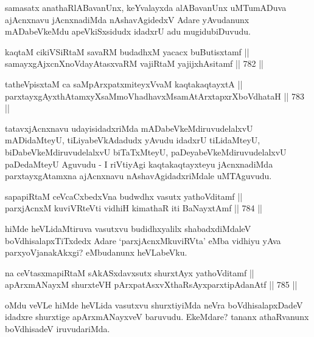 \begin{artha} 
samasatx anathaRlABavanUnx, keYvalayxda alABavanUnx uMTumADuva ajAcnxnavu jAcnxnadiMda nAshavAgidedxV Adare yAvudanunx mADabeVkeMdu apeVkiSxsidudx idadxrU adu mugidubiDuvudu.
\end{artha}


\begin{shl}
kaqtaM cikiVSiRtaM savaRM budadhxM yacacx buButisxtamf || \\
samayxgAjxcnXnoVdayAtasxvaRM vajiRtaM yajijxhAsitamf \hfill || 782 ||  
\end{shl}

\begin{shl}
tatheVpisxtaM ca saMpArxpatxmiteyxVvaM kaqtakaqtayxtA || \\
parxtayxgAyxthAtamxyXsaMmoVhadhavxMsamAtArxtapxrXboVdhataH \hfill || 783 ||  
\end{shl}

\begin{artha} 
tatavxjAcnxnavu udayisidadxriMda mADabeVkeMdiruvudelalxvU mADidaMteyU, tiLiyabeVkAdadudx yAvudu idadxrU tiLidaMteyU, biDabeVkeMdiruvudelalxvU biTaTxMteyU, paDeyabeVkeMdiruvudelalxvU paDedaMteyU Aguvudu - I riVtiyAgi kaqtakaqtayxteyu jAcnxnadiMda parxtayxgAtamxna ajAcnxnavu nAshavAgidadxriMdale uMTAguvudu.
\end{artha}


\begin{shl}
sapapiRtaM ceVcaCxbedxVna budwdhx vasutx yathoVditamf || \\
parxjAcnxM kuviVRteVti vidhiH kimathaR iti BaNayxtAmf \hfill || 784 ||  
\end{shl}

\begin{artha} 
hiMde heVLidaMtiruva vasutxvu budidhxyalilx shabadxdiMdaleV boVdhisalapxTiTxdedx Adare `parxjAcnxMkuviRVta' eMba vidhiyu yAva parxyoVjanakAkxgi? eMbudanunx heVLabeVku.
\end{artha}

\begin{shl}
na ceVtasxmapiRtaM sAkASxdavxsutx shurxtAyx yathoVditamf ||  \\
apArxmANayxM shurxteVH pArxpatAsxvXthaRsAyxparxtipAdanAtf \hfill || 785 ||  
\end{shl}

\begin{artha} 
oMdu veVLe hiMde heVLida vasutxvu shurxtiyiMda neVra boVdhisalapxDadeV idadxre shurxtige apArxmANayxveV baruvudu. EkeMdare? tananx athaRvanunx boVdhisadeV iruvudariMda.
\end{artha}

